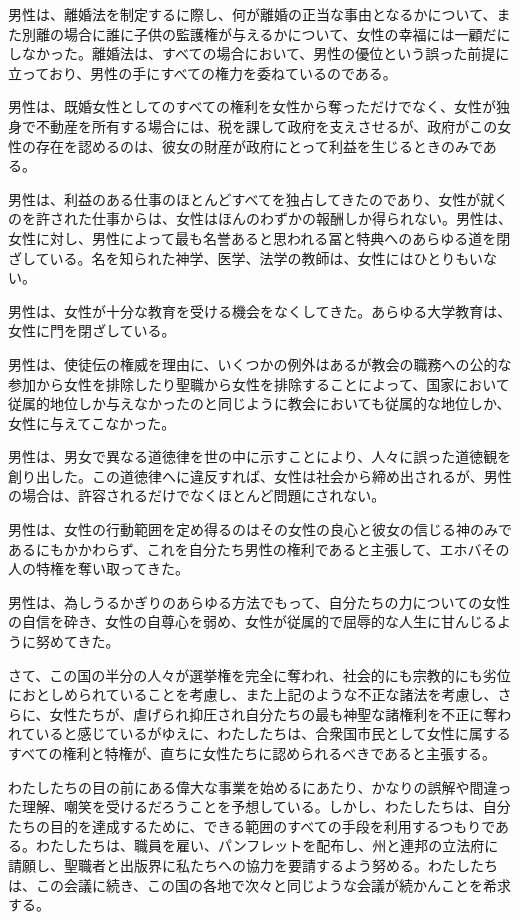 男性は、離婚法を制定するに際し、何が離婚の正当な事由となるかについて、また別離の場合に誰に子供の監護権が与えるかについて、女性の幸福には一顧だにしなかった。離婚法は、すべての場合において、男性の優位という誤った前提に立っており、男性の手にすべての権力を委ねているのである。

男性は、既婚女性としてのすべての権利を女性から奪っただけでなく、女性が独身で不動産を所有する場合には、税を課して政府を支えさせるが、政府がこの女性の存在を認めるのは、彼女の財産が政府にとって利益を生じるときのみである。

男性は、利益のある仕事のほとんどすべてを独占してきたのであり、女性が就くのを許された仕事からは、女性はほんのわずかの報酬しか得られない。男性は、女性に対し、男性によって最も名誉あると思われる冨と特典へのあらゆる道を閉ざしている。名を知られた神学、医学、法学の教師は、女性にはひとりもいない。

男性は、女性が十分な教育を受ける機会をなくしてきた。あらゆる大学教育は、女性に門を閉ざしている。

男性は、使徒伝の権威を理由に、いくつかの例外はあるが教会の職務への公的な参加から女性を排除したり聖職から女性を排除することによって、国家において従属的地位しか与えなかったのと同じように教会においても従属的な地位しか、女性に与えてこなかった。

男性は、男女で異なる道徳律を世の中に示すことにより、人々に誤った道徳観を創り出した。この道徳律へに違反すれば、女性は社会から締め出されるが、男性の場合は、許容されるだけでなくほとんど問題にされない。

男性は、女性の行動範囲を定め得るのはその女性の良心と彼女の信じる神のみであるにもかかわらず、これを自分たち男性の権利であると主張して、エホバその人の特権を奪い取ってきた。

男性は、為しうるかぎりのあらゆる方法でもって、自分たちの力についての女性の自信を砕き、女性の自尊心を弱め、女性が従属的で屈辱的な人生に甘んじるように努めてきた。
  

さて、この国の半分の人々が選挙権を完全に奪われ、社会的にも宗教的にも劣位におとしめられていることを考慮し、また上記のような不正な諸法を考慮し、さらに、女性たちが、虐げられ抑圧され自分たちの最も神聖な諸権利を不正に奪われていると感じているがゆえに、わたしたちは、合衆国市民として女性に属するすべての権利と特権が、直ちに女性たちに認められるべきであると主張する。
  
わたしたちの目の前にある偉大な事業を始めるにあたり、かなりの誤解や間違った理解、嘲笑を受けるだろうことを予想している。しかし、わたしたちは、自分たちの目的を達成するために、できる範囲のすべての手段を利用するつもりである。わたしたちは、職員を雇い、パンフレットを配布し、州と連邦の立法府に請願し、聖職者と出版界に私たちへの協力を要請するよう努める。わたしたちは、この会議に続き、この国の各地で次々と同じような会議が続かんことを希求する。



